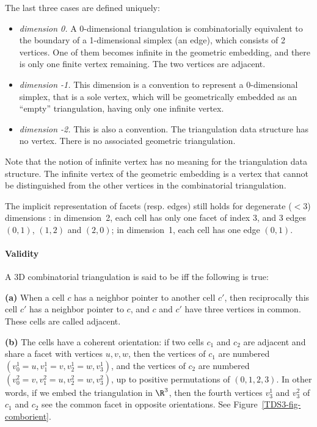 The last three cases are defined uniquely:
\begin{itemize}
\item \emph{dimension 0.} A 0-dimensional triangulation is
combinatorially equivalent to the boundary of a 1-dimensional simplex
(an edge), which consists of 2 vertices. One of them becomes infinite
in the geometric embedding, and there is only one finite vertex
remaining. The two vertices are adjacent.
\item \emph{dimension -1.} This dimension is a convention to represent a 
0-dimensional simplex, that is a sole vertex, which will be
geometrically embedded as an ``empty'' triangulation, having only one
infinite vertex.
\item \emph{dimension -2.} This is also a convention. The
triangulation data structure has no vertex. There is no associated
geometric triangulation.
\end{itemize} 

Note that the notion of infinite vertex has no meaning for the
triangulation data structure. The infinite vertex of the geometric
embedding is a vertex that cannot be distinguished from the other
vertices in the combinatorial triangulation.

The implicit representation of facets (resp. edges) still holds
for degenerate ($< 3$) dimensions : in dimension~2, each cell has only one
facet of index 3, and 3 edges $(0,1)$, $(1,2)$ and $(2,0)$; in
dimension~1, each cell has one edge $(0,1)$. 

\paragraph{Validity}
A 3D combinatorial triangulation is said to be  
iff the following is true:

{\bf (a)} When a cell $c$ has a neighbor pointer to another cell $c'$,
then reciprocally this cell $c'$ has a neighbor pointer to $c$, and
$c$ and $c'$ have three vertices in common. These cells are called
adjacent. 

{\bf (b)} The cells have a coherent orientation: if two cells $c_1$
and $c_2$ are adjacent and share a facet with vertices $u,v,w$, then
the vertices of $c_1$ are numbered $(v_0^1 = u, v_1^1 = v, v_2^1 = w,
v_3^1)$, and the vertices of $c_2$ are numbered $(v_0^2 = v, v_1^2 = u,
v_2^2 = w, v_3^2)$, up to positive permutations of $(0,1,2,3)$. In
other words, if we embed the triangulation in $\R^3$, then the fourth
vertices $v_3^1$ and $v_3^2$ of $c_1$ and $c_2$ see the common facet
in opposite orientations. See Figure~\ref{TDS3-fig-comborient}.

